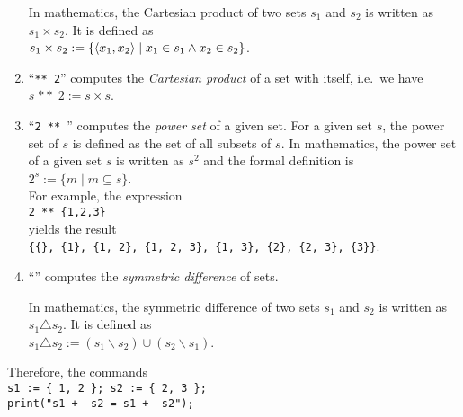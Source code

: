 \begin{enumerate}
      In mathematics, the Cartesian product of two sets $s_1$ and $s_2$ is written
      as $s_1 \times s_2$.  It is defined as
      \\[0.2cm]
      \hspace*{1.3cm}
      $s_1 \times s_2 := \{ \pair(x_1,x_2) \mid x_1 \in s_1 \wedge x_2 \in s_2 \}$.
\item ``\texttt{** 2}'' computes the \emph{Cartesian product} of a set with itself,
      i.e.~we have 
      \\[0.2cm]
      \hspace*{1.3cm}
      $s \;\mathtt{**}\; 2 := s \times s$.
\item ``\texttt{2 ** }'' computes the \emph{power set} of a given set.  For a given set
      $s$, the power set of $s$ is defined as the set of all subsets of $s$.
      In mathematics, the power set of a given set $s$ is written as $s^2$ and the formal
      definition is
      \\[0.2cm]
      \hspace*{1.3cm}
      $2^s := \{ m \mid m \subseteq s \}$.
      \\[0.2cm]
      For example, the expression
      \\[0.2cm]
      \hspace*{1.3cm}
      \texttt{2 ** \{1,2,3\}}
      \\[0.2cm]
      yields the result
      \\[0.2cm]
      \hspace*{1.3cm}
      \texttt{\{\{\}, \{1\}, \{1, 2\}, \{1, 2, 3\}, \{1, 3\}, \{2\}, \{2, 3\}, \{3\}\}}.
\item ``\texttt{}'' computes the \emph{symmetric difference} of sets.

      In mathematics, the symmetric difference of two sets $s_1$ and $s_2$ is  written
      as $s_1 \triangle s_2$.  It is defined as
      \\[0.2cm]
      \hspace*{1.3cm}
      $s_1 \triangle s_2 := (s_1 \backslash s_2) \cup (s_2 \backslash s_1)$.
\end{enumerate}
Therefore, the commands
\\[0.2cm]
\hspace*{1.3cm}
\texttt{s1 := \{ 1, 2 \}; s2 := \{ 2, 3 \};}
\\
\hspace*{1.3cm}
\texttt{print("s1 + \ s2 = s1 + \ s2");}
\\
\hspace*{1.3cm}
